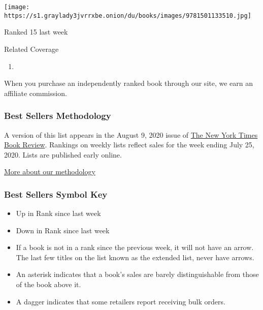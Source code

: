 \begin{enumerate}
  \texttt{[image: https://s1.graylady3jvrrxbe.onion/du/books/images/9781501133510.jpg]}

  Ranked 15 last week
\end{enumerate}

Related Coverage

\begin{enumerate}
\def\labelenumi{\arabic{enumi}.}
\tightlist
\item
  \href{https://www.nytimes3xbfgragh.onion/2020/07/31/books/review/the-system-robert-reich-break-em-up-zephyr-teachout.html}{}
\end{enumerate}

When you purchase an independently ranked book through our site, we earn
an affiliate commission.

\hypertarget{best-sellers-methodology}{%
\subsubsection{Best Sellers
Methodology}\label{best-sellers-methodology}}

A version of this list appears in the August 9, 2020 issue of
\href{http://www.nytimes3xbfgragh.onion/section/books/review}{The New
York Times Book Review}. Rankings on weekly lists reflect sales for the
week ending July 25, 2020. Lists are published early online.

\href{/books/best-sellers/methodology/}{More about our methodology}

\hypertarget{best-sellers-symbol-key}{%
\subsubsection{Best Sellers Symbol Key}\label{best-sellers-symbol-key}}

\begin{itemize}
\item
  Up in Rank since last week
\item
  Down in Rank since last week
\item
  If a book is not in a rank since the previous week, it will not have
  an arrow. The last few titles on the list known as the extended list,
  never have arrows.
\item
  An asterisk indicates that a book's sales are barely distinguishable
  from those of the book above it.
\item
  A dagger indicates that some retailers report receiving bulk orders.
\end{itemize}

